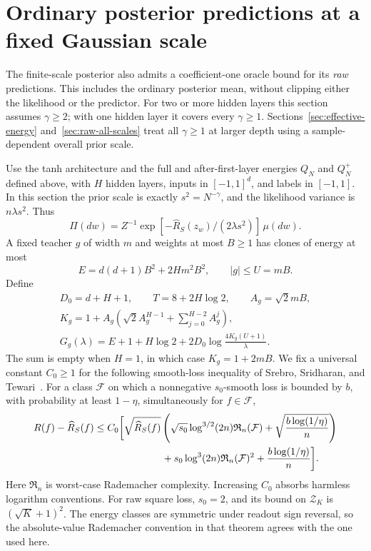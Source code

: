 \section{Ordinary posterior predictions at a fixed Gaussian scale}
\label{sec:fixed-raw-oracle}

The finite-scale posterior also admits a coefficient-one oracle bound
for its \emph{raw} predictions.  This includes the ordinary posterior
mean, without clipping either the likelihood or the predictor.  For
two or more hidden layers this section assumes $\gamma\geq2$; with one
hidden layer it covers every $\gamma\geq1$.  Sections~\ref{sec:effective-energy} and~\ref{sec:raw-all-scales} treat all
$\gamma\geq1$ at larger depth using a sample-dependent overall prior
scale.

Use the tanh architecture and the full and after-first-layer energies
$Q_N$ and $Q_N^+$ defined above, with $H$
hidden layers, inputs in $[-1,1]^d$, and labels in $[-1,1]$.  In this
section the prior scale is exactly $s^2=N^{-\gamma}$, and the likelihood
variance is $n\lambda s^2$.  Thus
\[
 \Pi(dw)=Z^{-1}\exp[-\widehat R_S(z_w)/(2\lambda s^2)]\,\mu(dw).
\]
A fixed teacher $g$ of width $m$ and weights at most $B\geq1$ has
clones of energy at most
\[
 E=d(d+1)B^2+2Hm^2B^2,\qquad |g|\leq U=mB.
\]
Define
\begin{gather*}
 D_0=d+H+1,\qquad T=8+2H\log2,\qquad
 A_g=\sqrt2mB,\\
 K_g=1+A_g\left(\sqrt2 A_g^{H-1}
                   +\sum_{j=0}^{H-2}A_g^j\right),\\
 G_g(\lambda)=E+1+H\log2
              +2D_0\log\frac{4K_g(U+1)}\lambda .
\end{gather*}
The sum is empty when $H=1$, in which case $K_g=1+2mB$.
We fix a universal constant $C_0\geq1$ for the following smooth-loss
inequality of Srebro, Sridharan, and Tewari~\cite[Theorem~1]{sst}.
For a class $\mathcal F$ on which a nonnegative $s_0$-smooth loss is
bounded by $b$, with probability at least $1-\eta$, simultaneously for
$f\in\mathcal F$,
\begin{align}
 R(f)-\widehat R_S(f)
 &\leq C_0\biggl[\sqrt{\widehat R_S(f)}
   \left(\sqrt{s_0}\log^{3/2}(2n)\mathfrak R_n(\mathcal F)
      +\sqrt{\frac{b\log(1/\eta)}n}\right)\notag\\
 &\hspace{24mm}+s_0\log^3(2n)\mathfrak R_n(\mathcal F)^2
             +\frac{b\log(1/\eta)}n\biggr].
 \label{eq:finite-raw-sst}
\end{align}
Here $\mathfrak R_n$ is worst-case Rademacher complexity.  Increasing
$C_0$ absorbs harmless logarithm conventions.  For raw square loss,
$s_0=2$, and its bound on $\mathcal Z_K$ is $(\sqrt K+1)^2$.
The energy classes are symmetric under readout sign reversal, so the
absolute-value Rademacher convention in that theorem agrees with the
one used here.

